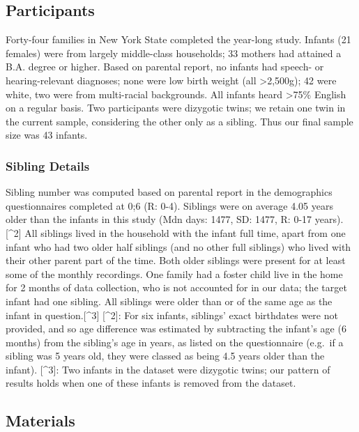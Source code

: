 \documentclass[
  english,
  man,floatsintext]{apa6}
\begin{document}
\hypertarget{participants}{%
\subsection{Participants}\label{participants}}

Forty-four families in New York State completed the year-long study. Infants (21 females) were from largely middle-class households; 33 mothers had attained a B.A. degree or higher. Based on parental report, no infants had speech- or hearing-relevant diagnoses; none were low birth weight (all \textgreater2,500g); 42 were white, two were from multi-racial backgrounds. All infants heard \textgreater75\% English on a regular basis. Two participants were dizygotic twins; we retain one twin in the current sample, considering the other only as a sibling. Thus our final sample size was 43 infants.

\hypertarget{sibling-details}{%
\subsubsection{Sibling Details}\label{sibling-details}}

Sibling number was computed based on parental report in the demographics questionnaires completed at 0;6 (R: 0-4). Siblings were on average 4.05 years older than the infants in this study (Mdn days: 1477, SD: 1477, R: 0-17 years).{[}\^{}2{]} All siblings lived in the household with the infant full time, apart from one infant who had two older half siblings (and no other full siblings) who lived with their other parent part of the time. Both older siblings were present for at least some of the monthly recordings. One family had a foster child live in the home for 2 months of data collection, who is not accounted for in our data; the target infant had one sibling. All siblings were older than or of the same age as the infant in question.{[}\^{}3{]}
{[}\^{}2{]}: For six infants, siblings' exact birthdates were not provided, and so age difference was estimated by subtracting the infant's age (6 months) from the sibling's age in years, as listed on the questionnaire (e.g.~if a sibling was 5 years old, they were classed as being 4.5 years older than the infant).
{[}\^{}3{]}: Two infants in the dataset were dizygotic twins; our pattern of results holds when one of these infants is removed from the dataset.

\hypertarget{materials}{%
\subsection{Materials}\label{materials}}
\end{document}
